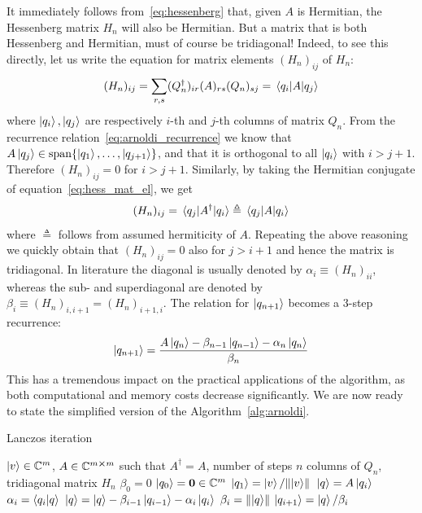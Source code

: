 It immediately follows from~\eqref{eq:hessenberg} that, given \(A\) is Hermitian, the Hessenberg matrix 
\(H_n\) will also be Hermitian. But a matrix that is both Hessenberg and Hermitian, must of course be tridiagonal!
Indeed, to see this directly, let us write the equation for matrix elements \((H_n)_{ij}\) of \(H_n\):
\begin{equation}
	(H_n)_{ij} = \sum_{r,s}(Q_n^{\dagger})_{ir}(A)_{rs}(Q_n)_{sj} = \matrixel{q_i}{A}{q_j}
	\label{eq:hess_mat_el}
\end{equation}
where \(\ket{q_i},\ket{q_j}\) are respectively \(i\)-th and \(j\)-th columns of matrix \(Q_n\). From 
the recurrence relation~\eqref{eq:arnoldi_recurrence} we know that 
\(A\ket{q_j} \in \mathrm{span}\{\ket{q_1},\ldots,\ket{q_{j+1}}\}\), and that it is orthogonal to all
\(\ket{q_i}\) with \(i > j+1\). Therefore \((H_n)_{ij} = 0\) for \(i>j+1\). Similarly, by taking the Hermitian conjugate
of equation~\eqref{eq:hess_mat_el}, we get
\begin{equation}
	(H_n)_{ij} = \matrixel{q_j}{A^{\dagger}}{q_i} \triangleq  \matrixel{q_j}{A}{q_i}	
\end{equation}
where \(\triangleq\) follows from assumed hermiticity of \(A\). Repeating the above reasoning we
quickly obtain that \((H_n)_{ij} = 0\) also for \(j > i+1\) and hence the matrix is tridiagonal.
In literature the diagonal is usually denoted by \(\alpha_i \equiv (H_n)_{ii}\), whereas the sub- and superdiagonal
are denoted by \(\beta_i \equiv (H_n)_{i,i+1} = (H_n)_{i+1,i}\). The relation for \(\ket{q_{n+1}}\) becomes
a \(3\)-step recurrence:
\begin{equation}
	\ket{q_{n+1}} = \frac{A \ket{q_n} - \beta_{n-1}\ket{q_{n-1}} - \alpha_n \ket{q_n}}{\beta_n}
	\label{eq:lanczos_recurrence}
\end{equation}
This has a tremendous impact on the practical applications of the algorithm, as both
computational and memory costs decrease significantly. We are now ready to state the simplified version of
the Algorithm~\ref{alg:arnoldi}.
\begin{algorithm}
	\algrenewcommand{}
	\algrenewcommand{}
	\caption{Lanczos iteration}
	\label{alg:lanczos}
	\begin{algorithmic}[1]
		\Require  \(\ket{v} \in \mathbb{C}^m\), \(A \in \mathbb{C}^{m\cross m}\) such that \(A^{\dagger} = A\), number of steps \(n\)
		\Ensure columns of \(Q_n\), tridiagonal matrix \(H_n\)
		\State \(\beta_0 = 0\)
		\State \(\ket{q_0} = \vectorbold{0} \in \CC^m\)
		\State \(\ket{q_1} = \ket{v}/\norm*{\ket{v}}\)
			\State \(\ket{q} = A\ket{q_i}\)
			\State \(\alpha_i = \braket{q_i}{q}\)
			\State \(\ket{q} = \ket{q} - \beta_{i-1}\ket{q_{i-1}} - \alpha_i \ket{q_i}\)
			\State \(\beta_i = \norm{\ket{q}} \) 
			\State \(\ket{q_{i+1}} = \ket{q}/\beta_i \)
		\EndFor
	\end{algorithmic}
\end{algorithm}
